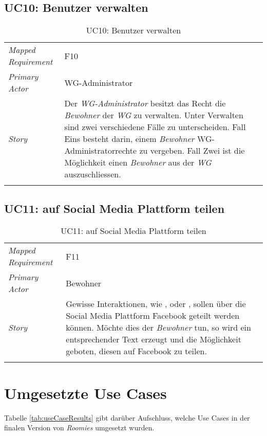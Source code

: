 \subsection{UC10: Benutzer verwalten}\label{subsec:uc10}
\begin{table}[H]
	\tablestyle
	\tablealtcolored
	\begin{tabularx}{\textwidth}{lX}
		\tablebody
			\textit{Mapped Requirement} &
			F10
			\tabularnewline
			\textit{Primary Actor} &
			WG-Administrator
			\tabularnewline
			\textit{Story} &
			Der \emph{WG-Administrator} besitzt das Recht die \emph{Bewohner} der \emph{WG} zu verwalten. Unter Verwalten sind zwei verschiedene Fälle zu unterscheiden. Fall Eins besteht darin, einem \emph{Bewohner} WG-Administratorrechte zu vergeben. Fall Zwei ist die Möglichkeit einen \emph{Bewohner} aus der \emph{WG} auszuschliessen.
			\tabularnewline
		\tableend
	\end{tabularx}
	\caption{UC10: Benutzer verwalten}
\end{table}


\subsection{UC11: auf Social Media Plattform teilen}\label{subsec:uc11}
\begin{table}[H]
	\tablestyle
	\tablealtcolored
	\begin{tabularx}{\textwidth}{lX}
		\tablebody
			\textit{Mapped Requirement} &
			F11
			\tabularnewline
			\textit{Primary Actor} &
			Bewohner
			\tabularnewline
			\textit{Story} &
			Gewisse Interaktionen, wie \nameref{subsec:uc3}, \nameref{subsec:uc7} oder \nameref{subsec:uc8}, sollen über die Social Media Plattform Facebook geteilt werden können. Möchte dies der \emph{Bewohner} tun, so wird ein entsprechender Text erzeugt und die Möglichkeit geboten, diesen auf Facebook zu teilen.
			\tabularnewline
		\tableend
	\end{tabularx}
	\caption{UC11: auf Social Media Plattform teilen}
\end{table}

\newpage
\section{Umgesetzte Use Cases}
Tabelle \ref{tab:useCaseResults} gibt darüber Aufschluss, welche Use Cases in der finalen Version von \emph{Roomies} umgesetzt wurden.

